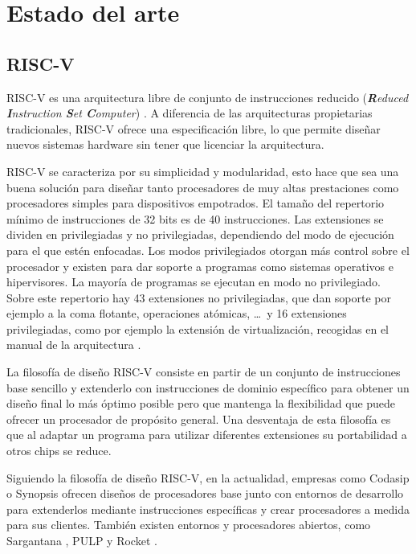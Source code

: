 \chapter{Estado del arte} \label{ch:estado_arte}

\section{RISC-V}

RISC-V es una arquitectura libre de conjunto de instrucciones reducido (\textit{\textbf{R}educed \textbf{I}nstruction \textbf{S}et \textbf{C}omputer}) \cite{ricv_org}. A diferencia de las arquitecturas propietarias tradicionales, RISC-V ofrece una especificación libre, lo que permite diseñar nuevos sistemas hardware sin tener que licenciar la arquitectura.

RISC-V se caracteriza por su simplicidad y modularidad, esto hace que sea una buena solución para diseñar tanto procesadores de muy altas prestaciones como procesadores simples para dispositivos empotrados. El tamaño del repertorio mínimo de instrucciones de 32 bits es de 40 instrucciones. Las extensiones se dividen en privilegiadas y no privilegiadas, dependiendo del modo de ejecución para el que estén enfocadas. Los modos privilegiados otorgan más control sobre el procesador y existen para dar soporte a programas como sistemas operativos e hipervisores. La mayoría de programas se ejecutan en modo no privilegiado. Sobre este repertorio hay 43 extensiones no privilegiadas,  que dan soporte por ejemplo a la coma flotante, operaciones atómicas, \ldots\ y 16 extensiones privilegiadas, como por ejemplo la extensión de virtualización, recogidas en el manual de la arquitectura \cite{riscv_scpec_unpriv, riscv_scpec_priv}.

La filosofía de diseño RISC-V consiste en partir de un conjunto de instrucciones base sencillo y extenderlo con instrucciones de dominio específico para obtener un diseño final lo más óptimo posible pero que mantenga la flexibilidad que puede ofrecer un procesador de propósito general. Una desventaja de esta filosofía es que al adaptar un programa para utilizar diferentes extensiones su portabilidad a otros chips se reduce.

Siguiendo la filosofía de diseño RISC-V, en la actualidad, empresas como Codasip \cite{codasip} o Synopsis \cite{synopsis} ofrecen diseños de procesadores base junto con entornos de desarrollo para extenderlos mediante instrucciones específicas y crear procesadores a medida para sus clientes. También existen entornos y procesadores abiertos, como Sargantana \cite{riscv_sargantana}, PULP \cite{riscv_pulp} y Rocket \cite{riscv_rocket}.

